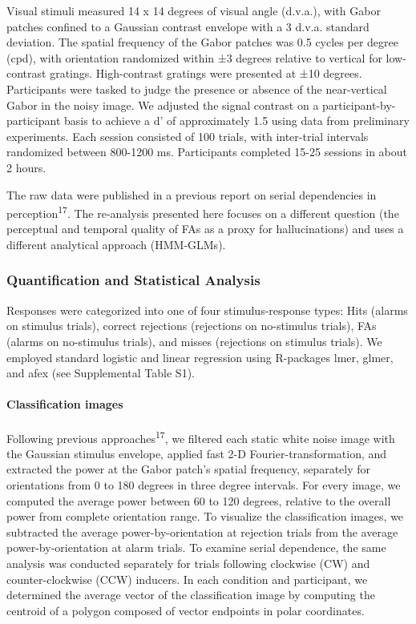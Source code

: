 \documentclass[
]{article}
\begin{document}
Visual stimuli measured 14 x 14 degrees of visual angle (d.v.a.), with
Gabor patches confined to a Gaussian contrast envelope with a 3 d.v.a.
standard deviation. The spatial frequency of the Gabor patches was 0.5
cycles per degree (cpd), with orientation randomized within ±3 degrees
relative to vertical for low-contrast gratings. High-contrast gratings
were presented at ±10 degrees. Participants were tasked to judge the
presence or absence of the near-vertical Gabor in the noisy image. We
adjusted the signal contrast on a participant-by-participant basis to
achieve a d' of approximately 1.5 using data from preliminary
experiments. Each session consisted of 100 trials, with inter-trial
intervals randomized between 800-1200 ms. Participants completed 15-25
sessions in about 2 hours.

The raw data were published in a previous report on serial dependencies
in perception\textsuperscript{17}. The re-analysis presented here
focuses on a different question (the perceptual and temporal quality of
FAs as a proxy for hallucinations) and uses a different analytical
approach (HMM-GLMs).

\hypertarget{quantification-and-statistical-analysis}{%
\subsubsection{Quantification and Statistical
Analysis}\label{quantification-and-statistical-analysis}}

Responses were categorized into one of four stimulus-response types:
Hits (alarms on stimulus trials), correct rejections (rejections on
no-stimulus trials), FAs (alarms on no-stimulus trials), and misses
(rejections on stimulus trials). We employed standard logistic and
linear regression using R-packages lmer, glmer, and afex (see
Supplemental Table S1).

\hypertarget{classification-images}{%
\paragraph{Classification images}\label{classification-images}}

Following previous approaches\textsuperscript{17}, we filtered each
static white noise image with the Gaussian stimulus envelope, applied
fast 2-D Fourier-transformation, and extracted the power at the Gabor
patch's spatial frequency, separately for orientations from 0 to 180
degrees in three degree intervals. For every image, we computed the
average power between 60 to 120 degrees, relative to the overall power
from complete orientation range. To visualize the classification images,
we subtracted the average power-by-orientation at rejection trials from
the average power-by-orientation at alarm trials. To examine serial
dependence, the same analysis was conducted separately for trials
following clockwise (CW) and counter-clockwise (CCW) inducers. In each
condition and participant, we determined the average vector of the
classification image by computing the centroid of a polygon composed of
vector endpoints in polar coordinates.
\end{document}
